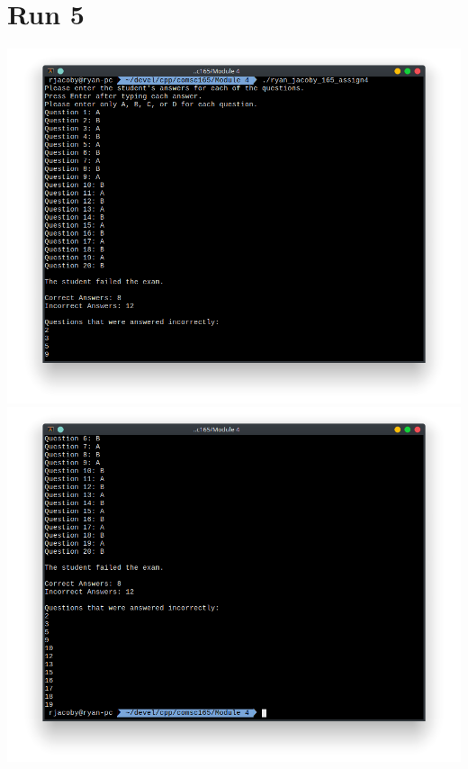 \documentclass[letterpaper, 11pt]{article}
\begin{document}
\section*{Run 5}
\includegraphics[scale=0.5]{run5_1.png} \\
\includegraphics[scale=0.5]{run5_2.png}
\end{document}
